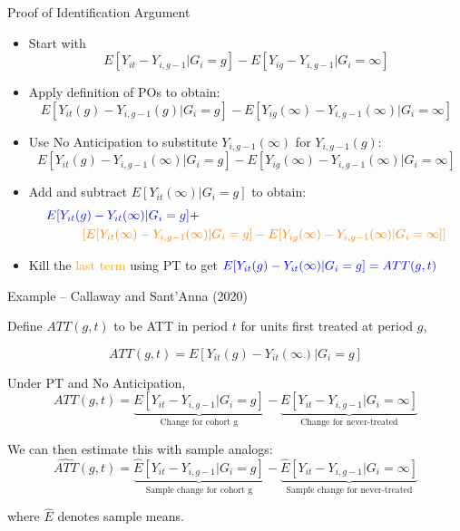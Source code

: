 \documentclass[usenames, dvipsnames, aspectratio = 169, 13pt]{beamer}
\newenvironment{wideitemize}{\itemize\addtolength{\itemsep}{10pt}}{\enditemize}
\begin{document}
\begin{frame}{Proof of Identification Argument}
\begin{itemize}
    \item
    Start with 
    $$E[Y_{it}- Y_{i,g-1}| G_i =g] - E[Y_{ig} - Y_{i,g-1}| G_i = \infty]$$
    
    \pause
    \item 
    Apply definition of POs to obtain: 
    $$E[Y_{it}(g) - Y_{i,g-1}(g) | G_i =g] - E[Y_{ig}(\infty) - Y_{i,g-1}(\infty) | G_i = \infty]$$
    
    \pause
    \item
    Use No Anticipation to substitute $Y_{i,g-1}(\infty)$ for $Y_{i,g-1}(g)$:
    $$E[Y_{it}(g) - Y_{i,g-1}(\infty) | G_i =g] - E[Y_{ig}(\infty) - Y_{i,g-1}(\infty) | G_i = \infty]$$

    
    \pause
    \item
    Add and subtract $E[ Y_{it}(\infty) | G_i =g] $ to obtain: 
    \begin{align*}
        &\textcolor{blue}{E[ Y_{it}(g) - Y_{it}(\infty) | G_i =g]} + \\
& \hspace{1cm} \textcolor{orange}{\left[ E[Y_{it}(\infty) - Y_{i,g-1}(\infty) | G_i =g] - E[Y_{ig}(\infty) - Y_{i,g-1}(\infty) | G_i = \infty] \right]}
    \end{align*} 
    
    \pause
    \item
    Kill the \textcolor{orange}{last term} using PT to get $\textcolor{blue}{E[Y_{it}(g) - Y_{it}(\infty) | G_i = g] = ATT(g,t)}$
\end{itemize}


\end{frame}
\begin{frame}{Example -- Callaway and Sant'Anna (2020)}
    \begin{wideitemize}
        \item
        Define $ATT(g,t)$ to be ATT in period $t$ for units first treated at period $g$,
        
        $$ATT(g,t) = E[ Y_{it}(g) - Y_{it}(\infty) | G_i = g] $$
        
        \pause
        \item
        Under PT and No Anticipation,
        $$ATT(g,t) = \underbrace{E[ Y_{it} - Y_{i,g-1}| G_i = g]}_{\text{Change for cohort g}} -  \underbrace{E[ Y_{it} - Y_{i,g-1}| G_i = \infty]}_{\text{Change for never-treated}} $$
        
        \pause
        \item
        We can then estimate this with sample analogs:
        $$\widehat{ATT}(g,t)= \underbrace{\widehat{E}[ Y_{it} - Y_{i,g-1} | G_i = g]}_{\text{Sample change for cohort g}} -  \underbrace{\widehat{E}[ Y_{it} - Y_{i,g-1} | G_i = \infty]}_{\text{Sample change for never-treated}} $$
        
        where $\hat{E}$ denotes sample means. 
    
    \end{wideitemize}    
\end{frame}
\end{document}

